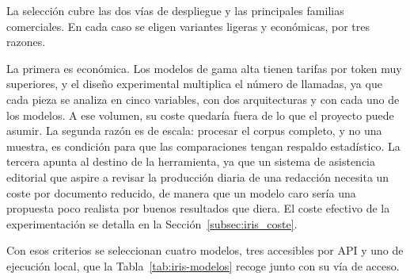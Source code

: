 

La selección cubre las dos vías de despliegue y las principales familias
comerciales. En cada caso se eligen variantes ligeras y económicas, por tres
razones.

La primera es económica. Los modelos de gama alta tienen tarifas por token muy
superiores, y el diseño experimental multiplica el número de llamadas, ya que
cada pieza se analiza en cinco variables, con dos arquitecturas y con cada uno de
los modelos. A ese volumen, su coste quedaría fuera de lo que el proyecto puede
asumir. La
segunda razón es de escala: procesar el corpus completo, y no una muestra, es
condición para que las comparaciones tengan respaldo estadístico. La tercera
apunta al destino de la herramienta, ya que un sistema de asistencia editorial
que aspire a revisar la producción diaria de una redacción necesita un coste por
documento reducido, de manera que un modelo caro sería una propuesta poco
realista por buenos resultados que diera. El coste efectivo de la
experimentación se detalla en la Sección~\ref{subsec:iris_coste}.

Con esos criterios se seleccionan cuatro modelos, tres accesibles por API y uno
de ejecución local, que la Tabla~\ref{tab:iris-modelos} recoge junto con su vía
de acceso.

\begin{table}[H]
    \centering
    \begingroup
    \small
    \endgroup
\end{table}

